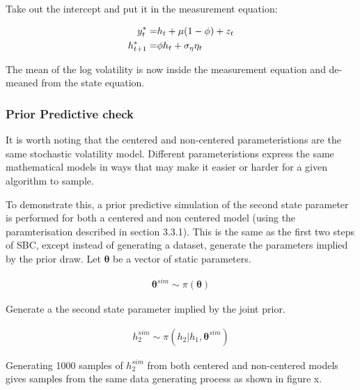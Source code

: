 \documentclass[12pt, a4paper]{article}
\begin{document}
        Take out the intercept and put it in the measurement equation:
        
        $$
        \begin{aligned}
        y^{\ast}_t =& h_t + \mu (1- \phi) + z_t \\
        h^{\ast}_{t+1} =& \space \phi h_t + \sigma_{\eta} \eta_t  \\
        \end{aligned}
        $$
        
        The mean of the log volatility is now inside the measurement equation and de-meaned from the state equation.

        \subsubsection{Prior Predictive check}
        It is worth noting that the centered and non-centered parameteristions are the same stochastic volatility model. Different parameteristions express the same mathematical models in ways that may make it easier or harder for a given algorithm to sample. 

        To demonstrate this, a prior predictive simulation of the second state parameter is performed for both a centered and non centered model (using the paramterisation described in section 3.3.1). This is the same as the first two steps of SBC, except instead of generating a dataset, generate the parameters implied by the prior draw. Let $\boldsymbol{\theta}$ be a vector of static parameters.

        $$
        \begin{aligned}
        \boldsymbol{\theta}^{sim} \sim \pi(\boldsymbol{\theta})
        \end{aligned}
        $$

        Generate a the second state parameter implied by the joint prior.

        $$
        \begin{aligned}
        h_2^{sim} \sim \pi (h_2|h_1, \boldsymbol{\theta}^{sim})
        \end{aligned}
        $$

        Generating 1000 samples of $h_2^{sim}$ from both centered and non-centered models gives samples from the same data generating process as shown in figure x. 


        
\end{document}
